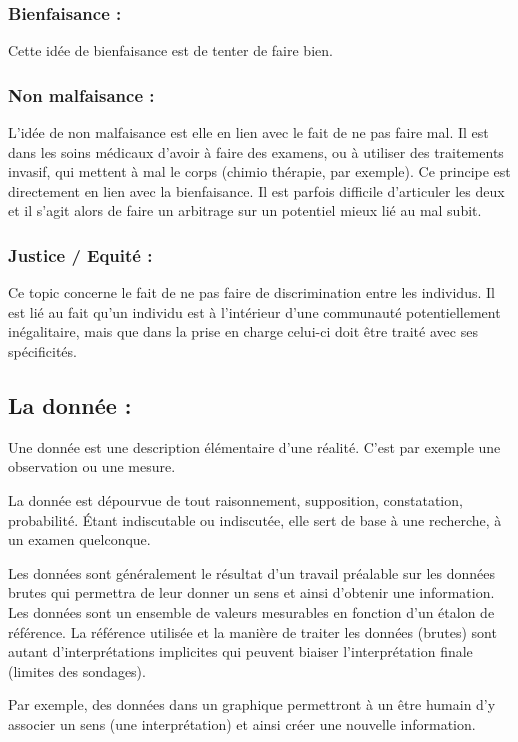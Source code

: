 \documentclass[a4paper,12pt]{article}
\begin{document}
\subsubsection{Bienfaisance : }

Cette idée de bienfaisance est de tenter de faire bien. 


\subsubsection{Non malfaisance : }

L'idée de non malfaisance est elle en lien avec le fait de ne pas faire mal. Il est dans les soins médicaux d'avoir à faire des examens, ou à utiliser des traitements invasif, qui mettent à mal le corps (chimio thérapie, par exemple). Ce principe est directement en lien avec la bienfaisance. Il est parfois difficile d'articuler les deux et il s'agit alors de faire un arbitrage sur un potentiel mieux lié au mal subit. 


\subsubsection{Justice / Equité : }

Ce topic concerne le fait de ne pas faire de discrimination entre les individus. Il est lié au fait qu'un individu est à l'intérieur d'une communauté potentiellement inégalitaire, mais que dans la prise en charge celui-ci doit être traité avec ses spécificités. 

\subsection{La donnée : }
Une donnée est une description élémentaire d’une réalité. C’est par exemple une observation ou une mesure.

La donnée est dépourvue de tout raisonnement, supposition, constatation, probabilité. Étant indiscutable ou indiscutée, elle sert de base à une recherche, à un examen quelconque.

Les données sont généralement le résultat d'un travail préalable sur les données brutes qui permettra de leur donner un sens et ainsi d'obtenir une information. Les données sont un ensemble de valeurs mesurables en fonction d'un étalon de référence. La référence utilisée et la manière de traiter les données (brutes) sont autant d’interprétations implicites qui peuvent biaiser l’interprétation finale (limites des sondages).

Par exemple, des données dans un graphique permettront à un être humain d'y associer un sens (une interprétation) et ainsi créer une nouvelle information.
\end{document}
